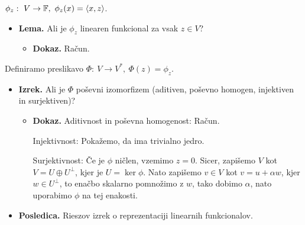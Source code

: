 \begin{enumerate}
    $\phi_z: \ V \to \mathbb{F}, \ \phi_z(x) = \left\langle x, z \right\rangle$.
    \begin{itemize}
        \item \colorbox{blue!30}{\textbf{Lema.}} Ali je $\phi_z$ linearen funkcional za vsak $z \in V$?
        \begin{itemize}
            \item \colorbox{green!30}{\textbf{Dokaz.}} Račun.            
        \end{itemize}
    \end{itemize}    
    Definiramo preslikavo $\Phi: \ V \to V^*, \ \Phi(z) = \phi_z$. 
    \begin{itemize}
        \item  \colorbox{blue!30}{\textbf{Izrek.}} Ali je $\Phi$ poševni izomorfizem (aditiven, poševno homogen, injektiven in surjektiven)?
        \begin{itemize}
            \item \colorbox{green!30}{\textbf{Dokaz.}} Aditivnost in poševna homogenost: Račun.
            
            Injektivnost: Pokažemo, da ima trivialno jedro.

            Surjektivnost: Če je $\phi$ ničlen, vzemimo $z = 0$. Sicer, zapišemo $V$ kot $V = U \oplus U^\perp$, kjer je $U = \ker \phi$. Nato zapišemo $v \in V$ kot $v = u + \alpha w$, kjer $w \in U^\perp$, to enačbo skalarno pomnožimo z $w$, tako dobimo $\alpha$, nato uporabimo $\phi$ na tej enakosti.
        \end{itemize}
        \item \colorbox{orange!30}{\textbf{Posledica.}} Rieszov izrek o reprezentaciji linearnih funkcionalov.
    \end{itemize}
\end{enumerate}

\newpage
\